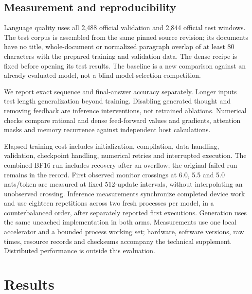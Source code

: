 \documentclass[11pt]{article}
\begin{document}
\subsection{Measurement and reproducibility}
Language quality uses all 2,488 official validation and 2,844 official test
windows. The test corpus is assembled from the same pinned source revision;
its documents have no title, whole-document or normalized paragraph overlap
of at least 80 characters with the prepared training and validation data.
The dense recipe is fixed before opening its test results. The baseline is a
new comparison against an already evaluated model, not a blind model-selection
competition.

We report exact sequence and final-answer accuracy separately. Longer inputs
test length generalization beyond training. Disabling generated thought and
removing feedback are inference interventions, not retrained ablations.
Numerical checks compare rational and dense feed-forward values and gradients,
attention masks and memory recurrence against independent host calculations.

Elapsed training cost includes initialization, compilation, data handling,
validation, checkpoint handling, numerical retries and interrupted execution.
The combined BF16 run includes recovery after an overflow; the original failed
run remains in the record. First observed monitor crossings at 6.0, 5.5 and
5.0 nats/token are measured at fixed 512-update intervals, without interpolating
an unobserved crossing. Inference measurements synchronize completed device
work and use eighteen repetitions across two fresh processes per model, in a
counterbalanced order, after separately reported first executions.
Generation uses the same uncached implementation in both arms. Measurements
use one local accelerator and a bounded process working set; hardware,
software versions, raw times, resource records and checksums accompany the
technical supplement. Distributed performance is outside this evaluation.

\section{Results}
\end{document}
